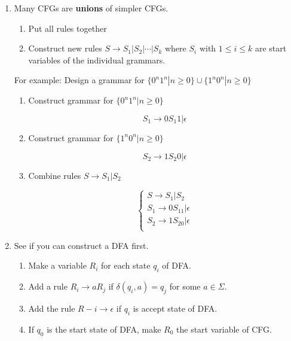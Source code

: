 \documentclass{article}
\begin{document}
\begin{enumerate}
\item Many CFGs are \textbf{unions} of simpler CFGs.
  \begin{enumerate}[label=(\alph*)]
    \item Put all rules together
    \item Construct new rules $S\rightarrow{}S_1|S_2|\cdots|S_k$ where
      $S_i$ with $1\le{}i\le{}k$ are start variables of the individual
      grammars.
  \end{enumerate}

  For example: Design a grammar for
  $\{0^n1^n|n\ge0\}\cup\{1^n0^n|n\ge0\}$

  \begin{enumerate}[label=(\arabic*)]
    \item Construct grammar for $\{0^n1^n|n\ge0\}$

      \[
      S_1\rightarrow 0 S_1 1|\epsilon
      \]

    \item Construct grammar for $\{1^n0^n|n\ge0\}$

      \[
      S_2\rightarrow 1 S_2 0|\epsilon
      \]

    \item Combine rules $S\rightarrow{}S_1|S_2$

      \[
      \begin{cases}
        S\rightarrow S_1|S_2 \\
        S_1\rightarrow 0S_11|\epsilon \\
        S_2\rightarrow 1S_20|\epsilon \\
      \end{cases}
      \]
  \end{enumerate}

\item See if you can construct a DFA first.
  \begin{enumerate}[label=(\alph*)]
    \item Make a variable $R_i$ for each state $q_i$ of DFA.
    \item Add a rule $R_i\rightarrow{}aR_j$ if $\delta(q_i,a)=q_j$ for
      some $a\in\Sigma$.
    \item Add the rule $R-i\rightarrow\epsilon$ if $q_i$ is accept
      state of DFA.
    \item If $q_0$ is the start state of DFA, make $R_0$ the start
      variable of CFG.
  \end{enumerate}


\end{enumerate}
\end{document}
